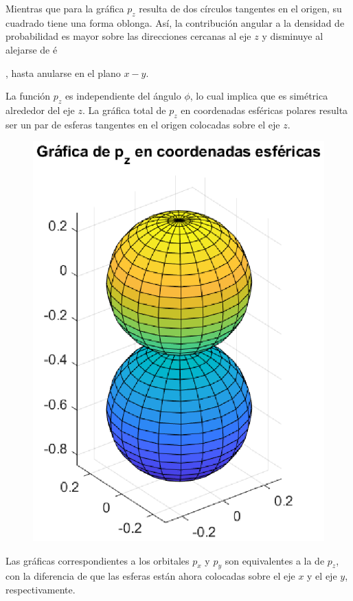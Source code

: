 Mientras que para  la gráfica $p_{z}$ resulta de dos círculos tangentes en el origen, su cuadrado tiene una forma oblonga. Así, la contribución angular a la densidad de probabilidad es mayor sobre las direcciones cercanas al eje $z$ y disminuye al alejarse de é{, hasta anularse en el plano $x-y$.
\par
La función $p_{z}$ es independiente del ángulo $\phi$, lo cual implica que es simétrica alrededor del eje $z$. La gráfica total de $p_{z}$ en coordenadas esféricas polares resulta ser un par de esferas tangentes en el origen colocadas sobre el eje $z$.
\begin{figure}[H]
    \centering
    \includegraphics[scale=1]{Imagenes/Plot_AER_pz_theta_total3D.eps}
\end{figure}
Las gráficas correspondientes a los orbitales $p_{x}$ y $p_{y}$ son equivalentes a la de $p_{z}$, con la diferencia de que las esferas están ahora colocadas sobre el eje $x$ y el eje $y$, respectivamente.
}

